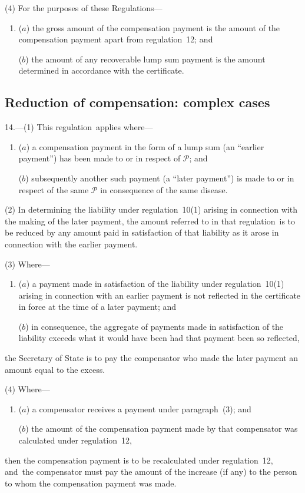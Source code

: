 \documentclass[12pt,a4paper]{article}
\begin{document}
(4) For the purposes of these Regulations—
\begin{enumerate}\item[]
($a$) the gross amount of the compensation payment is the amount of the compensation payment apart from regulation~12; and

($b$) the amount of any recoverable lump sum payment is the amount determined in accordance with the certificate.
\end{enumerate}

\subsection[14. Reduction of compensation: complex cases]{Reduction of compensation: complex cases}

14.---(1)  This regulation~applies where—
\begin{enumerate}\item[]
($a$) a compensation payment in the form of a lump sum (an “earlier payment”) has been made to or in respect of $\mathcal{P}$; and

($b$) subsequently another such payment (a “later payment”) is made to or in respect of the same $\mathcal{P}$ in consequence of the same disease.
\end{enumerate}

(2) In determining the liability under regulation~10(1) arising in connection with the making of the later payment, the amount referred to in that regulation~is to be reduced by any amount paid in satisfaction of that liability as it arose in connection with the earlier payment.

(3) Where—
\begin{enumerate}\item[]
($a$) a payment made in satisfaction of the liability under regulation~10(1) arising in connection with an earlier payment is not reflected in the certificate in force at the time of a later payment; and

($b$) in consequence, the aggregate of payments made in satisfaction of the liability exceeds what it would have been had that payment been so reflected,
\end{enumerate}
the Secretary of State is to pay the compensator who made the later payment an amount equal to the excess.

(4) Where—
\begin{enumerate}\item[]
($a$) a compensator receives a payment under paragraph~(3); and

($b$) the amount of the compensation payment made by that compensator was calculated under regulation~12,
\end{enumerate}
then the compensation payment is to be recalculated under regulation~12, and~the compensator must pay the amount of the increase (if any) to the person to whom the compensation payment was made.
\end{document}
